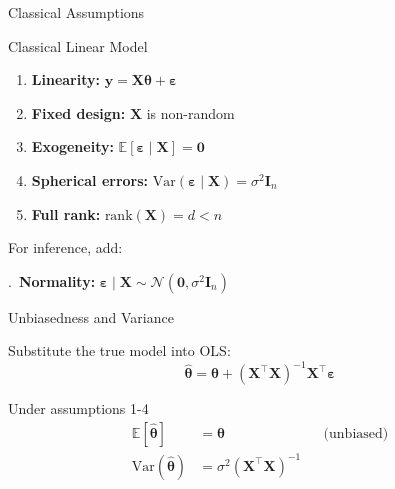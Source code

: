 \documentclass[aspectratio=169, professionalfonts]{beamer}
\def\E{\mathbb{E}}
\def\Var{\text{Var}}
\begin{document}
\begin{frame}{Classical Assumptions}

\begin{block}{Classical Linear Model}
\begin{enumerate}
  \item \textbf{Linearity:} $\mathbf{y} = \mathbf{X}\bm{\theta} + \bm{\varepsilon}$
  \item \textbf{Fixed design:} $\mathbf{X}$ is non-random
  \item \textbf{Exogeneity:} $\E[\bm{\varepsilon} \mid \mathbf{X}] = \mathbf{0}$
  \item \textbf{Spherical errors:}
        $\Var(\bm{\varepsilon} \mid \mathbf{X}) = \sigma^2\mathbf{I}_n$
  \item \textbf{Full rank:} $\text{rank}(\mathbf{X}) = d < n$
\end{enumerate}
\end{block}

For inference, add:

.\ \textbf{Normality:}
$\bm{\varepsilon} \mid \mathbf{X} \sim \mathcal{N}(\mathbf{0}, \sigma^2\mathbf{I}_n)$

\end{frame}

\begin{frame}{Unbiasedness and Variance}

Substitute the true model into OLS:
$$\hat{\bm{\theta}}
  = \bm{\theta}
  + (\mathbf{X}^\top\mathbf{X})^{-1}\mathbf{X}^\top\bm{\varepsilon}$$

\bigskip

\begin{block}{Under assumptions 1-4}
\begin{align*}
\E[\hat{\bm{\theta}}] &= \bm{\theta}
  &&\text{(unbiased)} \\[6pt]
\Var(\hat{\bm{\theta}}) &= \sigma^2(\mathbf{X}^\top\mathbf{X})^{-1}
\end{align*}
\end{block}

\end{frame}
\end{document}
